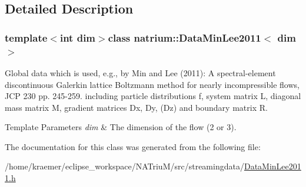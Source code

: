 \subsection{\-Detailed \-Description}
\subsubsection*{template$<$int dim$>$class natrium\-::\-Data\-Min\-Lee2011$<$ dim $>$}

\-Global data which is used, e.\-g., by \-Min and \-Lee (2011)\-: \-A spectral-\/element discontinuous \-Galerkin lattice \-Boltzmann method for nearly incompressible flows, \-J\-C\-P 230 pp. 245-\/259. including particle distributions f, system matrix \-L, diagonal mass matrix \-M, gradient matrices \-Dx, \-Dy, (\-Dz) and boundary matrix \-R. 


\begin{DoxyTemplParams}{\-Template Parameters}
{\em dim} & \-The dimension of the flow (2 or 3). \\
\hline
\end{DoxyTemplParams}


\-The documentation for this class was generated from the following file\-:\begin{DoxyCompactItemize}
\item 
/home/kraemer/eclipse\-\_\-workspace/\-N\-A\-Triu\-M/src/streamingdata/\hyperlink{DataMinLee2011_8h}{\-Data\-Min\-Lee2011.\-h}\end{DoxyCompactItemize}
